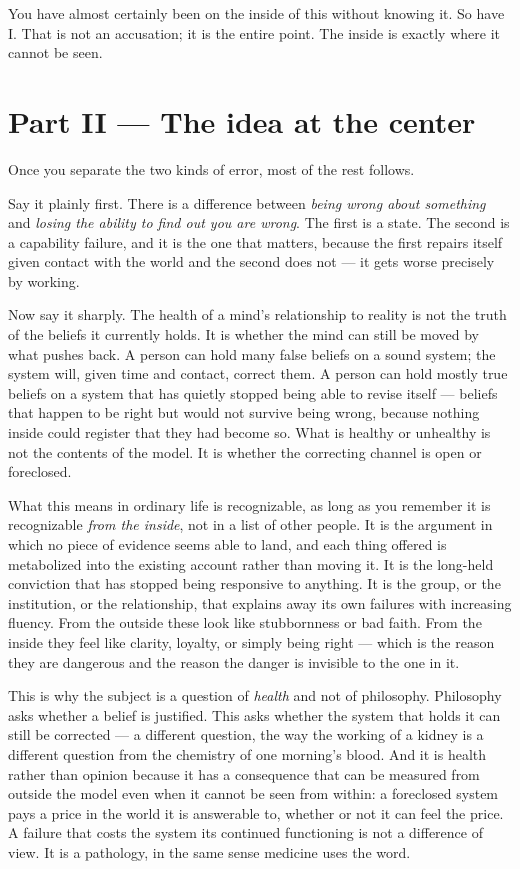\documentclass{article}
\begin{document}
You have almost certainly been on the inside of this without knowing it. So have I. That is not an accusation; it is the entire point. The inside is exactly where it cannot be seen.

\section*{Part II --- The idea at the center}

Once you separate the two kinds of error, most of the rest follows.

Say it plainly first. There is a difference between \textit{being wrong about something} and \textit{losing the ability to find out you are wrong}. The first is a state. The second is a capability failure, and it is the one that matters, because the first repairs itself given contact with the world and the second does not --- it gets worse precisely by working.

Now say it sharply. The health of a mind's relationship to reality is not the truth of the beliefs it currently holds. It is whether the mind can still be moved by what pushes back. A person can hold many false beliefs on a sound system; the system will, given time and contact, correct them. A person can hold mostly true beliefs on a system that has quietly stopped being able to revise itself --- beliefs that happen to be right but would not survive being wrong, because nothing inside could register that they had become so. What is healthy or unhealthy is not the contents of the model. It is whether the correcting channel is open or foreclosed.

What this means in ordinary life is recognizable, as long as you remember it is recognizable \textit{from the inside}, not in a list of other people. It is the argument in which no piece of evidence seems able to land, and each thing offered is metabolized into the existing account rather than moving it. It is the long-held conviction that has stopped being responsive to anything. It is the group, or the institution, or the relationship, that explains away its own failures with increasing fluency. From the outside these look like stubbornness or bad faith. From the inside they feel like clarity, loyalty, or simply being right --- which is the reason they are dangerous and the reason the danger is invisible to the one in it.

This is why the subject is a question of \textit{health} and not of philosophy. Philosophy asks whether a belief is justified. This asks whether the system that holds it can still be corrected --- a different question, the way the working of a kidney is a different question from the chemistry of one morning's blood. And it is health rather than opinion because it has a consequence that can be measured from outside the model even when it cannot be seen from within: a foreclosed system pays a price in the world it is answerable to, whether or not it can feel the price. A failure that costs the system its continued functioning is not a difference of view. It is a pathology, in the same sense medicine uses the word.
\end{document}
